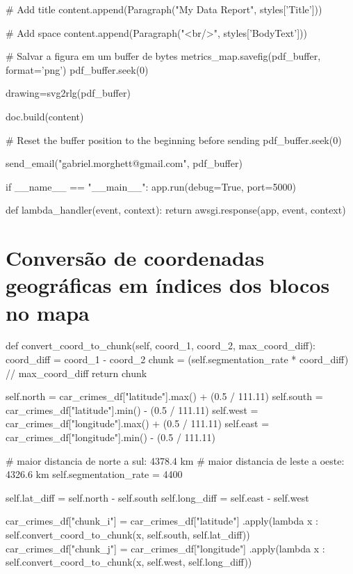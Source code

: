 \begin{python}
    # Add title
    content.append(Paragraph("My Data Report", styles['Title']))

    # Add space
    content.append(Paragraph("<br/>", styles['BodyText']))

    # Salvar a figura em um buffer de bytes
    metrics_map.savefig(pdf_buffer, format='png')
    pdf_buffer.seek(0)

    drawing=svg2rlg(pdf_buffer)

    doc.build(content)

    # Reset the buffer position to the beginning before sending
    pdf_buffer.seek(0)

    send_email("gabriel.morghett@gmail.com", pdf_buffer)

if __name__ == "__main__":
    app.run(debug=True, port=5000)

def lambda_handler(event, context):
    return awsgi.response(app, event, context)

\end{python}

\section{Conversão de coordenadas geográficas em índices dos blocos no mapa}

\begin{python}
def convert_coord_to_chunk(self, coord_1, coord_2, max_coord_diff):
    coord_diff = coord_1 - coord_2
    chunk = (self.segmentation_rate * coord_diff) // max_coord_diff
    return chunk

    self.north = car_crimes_df["latitude"].max() + (0.5 / 111.11)
    self.south = car_crimes_df["latitude"].min() - (0.5 / 111.11)
    self.west = car_crimes_df["longitude"].max() + (0.5 / 111.11)
    self.east = car_crimes_df["longitude"].min() - (0.5 / 111.11)

    # maior distancia de norte a sul: 4378.4 km
    # maior distancia de leste a oeste: 4326.6 km
    self.segmentation_rate = 4400

    self.lat_diff = self.north - self.south
    self.long_diff = self.east - self.west

    
    car_crimes_df["chunk_i"] = car_crimes_df["latitude"]
        .apply(lambda x : 
        self.convert_coord_to_chunk(x, self.south, self.lat_diff))
    car_crimes_df["chunk_j"] = car_crimes_df["longitude"]
        .apply(lambda x : 
        self.convert_coord_to_chunk(x, self.west, self.long_diff))
\end{python}

